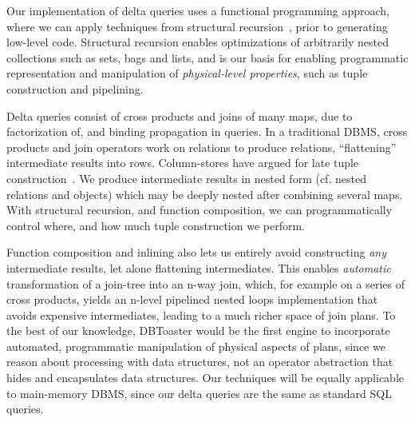 Our implementation of delta queries uses a functional programming approach,
where we can apply techniques from structural
recursion~\cite{buneman-kleisli:95}, prior to generating low-level code.
Structural recursion enables optimizations of arbitrarily nested collections
such as sets, bags and lists, and is our basis for enabling programmatic
representation and manipulation of \textit{physical-level properties}, such
as tuple construction and pipelining.

Delta queries consist of cross products and joins of many maps, due to
factorization of, and binding propagation in queries. In a traditional DBMS,
cross products and join operators work on relations to produce relations,
``flattening'' intermediate results into rows. Column-stores have argued for
late tuple construction~\cite{abadi-icde:07}. We produce intermediate results in
nested form (cf. nested relations and objects) which may be deeply nested after
combining several maps. With structural recursion, and function composition, we
can programmatically control where, and how much tuple construction we perform.

Function composition and inlining also lets us entirely avoid constructing
\textit{any} intermediate results, let alone flattening intermediates. This
enables \textit{automatic} transformation of a join-tree into an n-way join,
which, for example on a series of cross products, yields an n-level pipelined
nested loops implementation that avoids expensive intermediates, leading to a
much richer space of join plans. To the best of our knowledge, DBToaster would
be the first engine to incorporate automated, programmatic manipulation of
physical aspects of plans, since we reason about processing with data
structures, not an operator abstraction that hides and encapsulates data
structures. Our techniques will be equally applicable to main-memory DBMS, since
our delta queries are the same as standard SQL queries.



